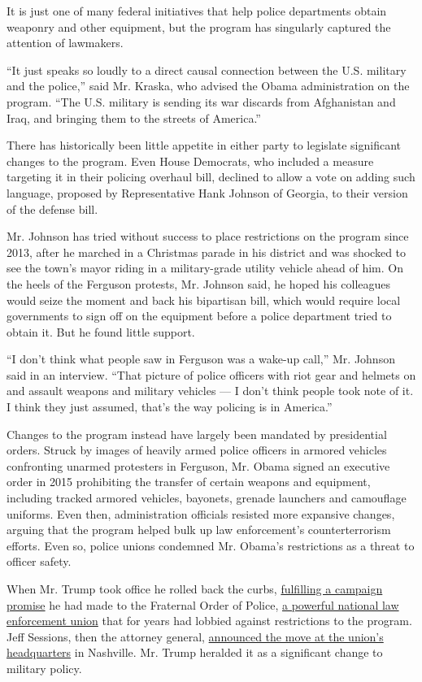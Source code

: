 It is just one of many federal initiatives that help police departments
obtain weaponry and other equipment, but the program has singularly
captured the attention of lawmakers.

``It just speaks so loudly to a direct causal connection between the
U.S. military and the police,'' said Mr. Kraska, who advised the Obama
administration on the program. ``The U.S. military is sending its war
discards from Afghanistan and Iraq, and bringing them to the streets of
America.''

There has historically been little appetite in either party to legislate
significant changes to the program. Even House Democrats, who included a
measure targeting it in their policing overhaul bill, declined to allow
a vote on adding such language, proposed by Representative Hank Johnson
of Georgia, to their version of the defense bill.

Mr. Johnson has tried without success to place restrictions on the
program since 2013, after he marched in a Christmas parade in his
district and was shocked to see the town's mayor riding in a
military-grade utility vehicle ahead of him. On the heels of the
Ferguson protests, Mr. Johnson said, he hoped his colleagues would seize
the moment and back his bipartisan bill, which would require local
governments to sign off on the equipment before a police department
tried to obtain it. But he found little support.

``I don't think what people saw in Ferguson was a wake-up call,'' Mr.
Johnson said in an interview. ``That picture of police officers with
riot gear and helmets on and assault weapons and military vehicles --- I
don't think people took note of it. I think they just assumed, that's
the way policing is in America.''

Changes to the program instead have largely been mandated by
presidential orders. Struck by images of heavily armed police officers
in armored vehicles confronting unarmed protesters in Ferguson, Mr.
Obama signed an executive order in 2015 prohibiting the transfer of
certain weapons and equipment, including tracked armored vehicles,
bayonets, grenade launchers and camouflage uniforms. Even then,
administration officials resisted more expansive changes, arguing that
the program helped bulk up law enforcement's counterterrorism efforts.
Even so, police unions condemned Mr. Obama's restrictions as a threat to
officer safety.

When Mr. Trump took office he rolled back the curbs,
\href{https://fop.net/CmsDocument/Doc/TrumpFirst100Days.pdf}{fulfilling
a campaign promise} he had made to the Fraternal Order of Police,
\href{https://www.nytimes.com/2020/06/25/us/politics/police-reforms-congress.html}{a
powerful national law enforcement union} that for years had lobbied
against restrictions to the program. Jeff Sessions, then the attorney
general,
\href{https://www.nytimes.com/2017/08/28/us/politics/trump-police-military-surplus-equipment.html?action=click\&module=RelatedLinks\&pgtype=Article}{announced
the move at the union's headquarters} in Nashville. Mr. Trump heralded
it as a significant change to military policy.

